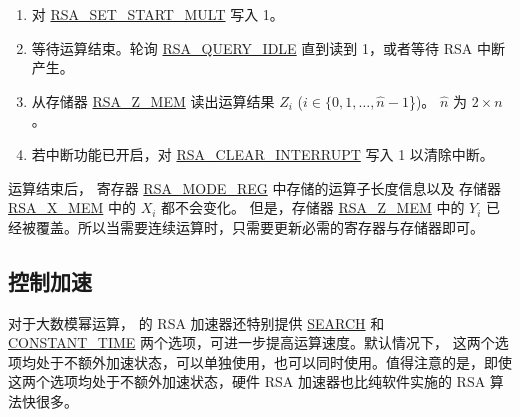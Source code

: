 \documentclass[main\_\_CN.tex]{subfiles}
\begin{document}
\begin{enumerate}
        只需要根据运算子长度，将这两个运算子中有效的数据写入存储器，没有使用到的存储器可以是任意值。

    \item 对 \hyperref[fielddesc:RSASETSTARTMULT]{RSA\_SET\_START\_MULT} 写入 1。

    \item 等待运算结束。轮询 \hyperref[fielddesc:RSAQUERYIDLE]{RSA\_QUERY\_IDLE} 直到读到 1，或者等待 RSA 中断产生。

    \item 从存储器 \hyperref[regdesc:RSAmemory]{RSA\_Z\_MEM} 读出运算结果 \begin{math}Z_{i}\end{math} (\begin{math}i \in \{ 0, 1, \dots, \hat{n}-1 \end{math}\})。
        \begin{math}\hat{n}\end{math} 为  \begin{math} 2 \times n \end{math} 。

    \item 若中断功能已开启，对 \hyperref[fielddesc:RSACLEARINTERRUPT]{RSA\_CLEAR\_INTERRUPT} 写入 1 以清除中断。

\end{enumerate}

运算结束后，
寄存器 \hyperref[regdesc:RSAMODEREG]{RSA\_MODE\_REG} 中存储的运算子长度信息以及
存储器 \hyperref[regdesc:RSAmemory]{RSA\_X\_MEM} 中的 \begin{math}{X}_{i}\end{math} 都不会变化。
但是，存储器 \hyperref[regdesc:RSAmemory]{RSA\_Z\_MEM} 中的 \begin{math}{Y}_{i}\end{math}
已经被覆盖。所以当需要连续运算时，只需要更新必需的寄存器与存储器即可。

\subsection{控制加速}\label{sec:Accelerate options}

对于大数模幂运算，\chipname{} 的 RSA 加速器还特别提供 \hyperref[regdesc:RSASEARCHENABLEREG]{SEARCH} 和 \hyperref[regdesc:RSACONSTANTTIMEREG]{CONSTANT\_TIME} 两个选项，可进一步提高运算速度。默认情况下， 这两个选项均处于不额外加速状态，可以单独使用，也可以同时使用。值得注意的是，即使这两个选项均处于不额外加速状态，硬件 RSA 加速器也比纯软件实施的 RSA 算法快很多。
\end{document}
